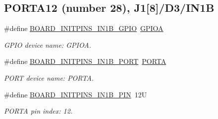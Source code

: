 \subsection*{P\+O\+R\+T\+A12 (number 28), J1\mbox{[}8\mbox{]}/\+D3/\+I\+N1B}
\begin{DoxyCompactItemize}
\item 
\mbox{\label{group__pin__mux_gabf500f54ec3c74cf9297e1dddd67782f}} 
\#define \mbox{\hyperlink{group__pin__mux_gabf500f54ec3c74cf9297e1dddd67782f}{B\+O\+A\+R\+D\+\_\+\+I\+N\+I\+T\+P\+I\+N\+S\+\_\+\+I\+N1\+B\+\_\+\+G\+P\+IO}}~\mbox{\hyperlink{group___g_p_i_o___peripheral___access___layer_gac485358099728ddae050db37924dd6b7}{G\+P\+I\+OA}}
\begin{DoxyCompactList}\small\item\em G\+P\+IO device name\+: G\+P\+I\+OA. \end{DoxyCompactList}\item 
\mbox{\label{group__pin__mux_ga3b875ea877ce3a334f666128cc219e5d}} 
\#define \mbox{\hyperlink{group__pin__mux_ga3b875ea877ce3a334f666128cc219e5d}{B\+O\+A\+R\+D\+\_\+\+I\+N\+I\+T\+P\+I\+N\+S\+\_\+\+I\+N1\+B\+\_\+\+P\+O\+RT}}~\mbox{\hyperlink{group___p_o_r_t___peripheral___access___layer_ga7c8a7f98a98d8cb125dd57a66720ab30}{P\+O\+R\+TA}}
\begin{DoxyCompactList}\small\item\em P\+O\+RT device name\+: P\+O\+R\+TA. \end{DoxyCompactList}\item 
\mbox{\label{group__pin__mux_gaec86049b255f6c97fd6d3679a5308e22}} 
\#define \mbox{\hyperlink{group__pin__mux_gaec86049b255f6c97fd6d3679a5308e22}{B\+O\+A\+R\+D\+\_\+\+I\+N\+I\+T\+P\+I\+N\+S\+\_\+\+I\+N1\+B\+\_\+\+P\+IN}}~12U
\begin{DoxyCompactList}\small\item\em P\+O\+R\+TA pin index\+: 12. \end{DoxyCompactList}\end{DoxyCompactItemize}
